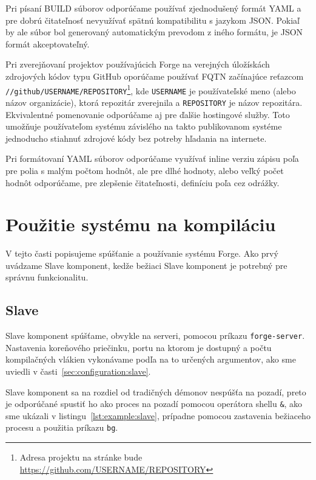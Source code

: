 Pri písaní BUILD súborov odporúčame používať zjednodušený formát YAML a pre dobrú
čitateľnosť nevyužívať spätnú kompatibilitu s jazykom JSON. Pokiaľ by ale súbor bol
generovaný automatickým prevodom z iného formátu, je JSON formát akceptovateľný.

Pri zverejňovaní projektov používajúcich Forge na verejných úložískách zdrojových
kódov typu GitHub oporúčame používať FQTN začínajúce reťazcom \\
\texttt{//github/USERNAME/REPOSITORY}\footnote{Adresa projektu na stránke bude \url{https://github.com/USERNAME/REPOSITORY}},
kde \texttt{USERNAME} je používateľské meno (alebo názov organizácie), ktorá repozitár
zverejnila a \texttt{REPOSITORY} je názov repozitára. Ekvivalentné pomenovanie odporúčame
aj pre ďalšie hostingové služby. Toto umožňuje používateľom systému závislého na
takto publikovanom systéme jednoducho stiahnuť zdrojové kódy bez potreby hľadania
na internete.

Pri formátovaní YAML súborov odporúčame využívať inline verziu zápisu poľa pre
polia s malým počtom hodnôt, ale pre dlhé hodnoty, alebo veľký počet hodnôt odporúčame,
pre zlepšenie čitateľnosti, definíciu poľa cez odrážky.

\section{Pou\v{z}itie syst\'{e}mu na kompil\'{a}ciu}
\label{sec:usage}

V tejto časti popisujeme spúšťanie a používanie systému Forge. Ako prvý uvádzame
Slave komponent, kedže bežiaci Slave komponent je potrebný pre správnu funkcionalitu. 

\subsection{Slave}
\label{sec:usage:server}

Slave komponent spúšťame, obvykle na serveri, pomocou príkazu \texttt{forge-server}.
Nastavenia koreňového priečinku, portu na ktorom je dostupný a počtu kompilačných
vlákien vykonávame podľa na to určených argumentov, ako sme uviedli v časti~\ref{sec:configuration:slave}.

Slave komponent sa na rozdiel od tradičných démonov nespúšťa na pozadí, preto je
odporúčané spustiť ho ako proces na pozadí pomocou operátora shellu \texttt{\&},
ako sme ukázali v listingu~\ref{lst:example:slave}, prípadne
pomocou zastavenia bežiaceho procesu a použitia príkazu \texttt{bg}.

